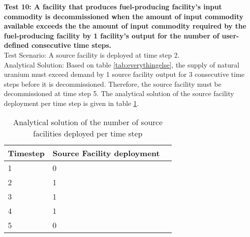 \documentclass[12pt,letterpaper]{article}
\begin{document}
\noindent
\textbf{Test 10: A facility that produces fuel-producing facility's input commodity is decommissioned when the amount of input commodity available exceeds the the amount of input commodity required by the fuel-producing facility by 1 facility's output for the number of user-defined consecutive time steps.} \\
Test Scenario: A source facility is deployed at time step 2. \\
Analytical Solution: Based on table \ref{tab:everythingelse}, the supply of natural uranium must exceed demand by 1 source facility output for 3 consecutive time steps before it is decommissioned. Therefore, the source facility must be decommissioned at time step 5. The analytical solution of the source facility deployment per time step is given in table \ref{tab:test-supplymoredemand2}. 

\begin{table}[H]
     \centering
    \begin{tabularx}{\textwidth}{bbb}
       \hline
       Timestep & Source Facility deployment \\
       \hline
       1 & 0 \\
       2 & 1 \\
       3 & 1 \\
       4 & 1 \\
       5 & 0 \\
       \hline
    \end{tabularx}
    \caption {Analytical solution of the number of source facilities deployed per time step}
    \label{tab:test-supplymoredemand2}
\end{table}
\end{document}

